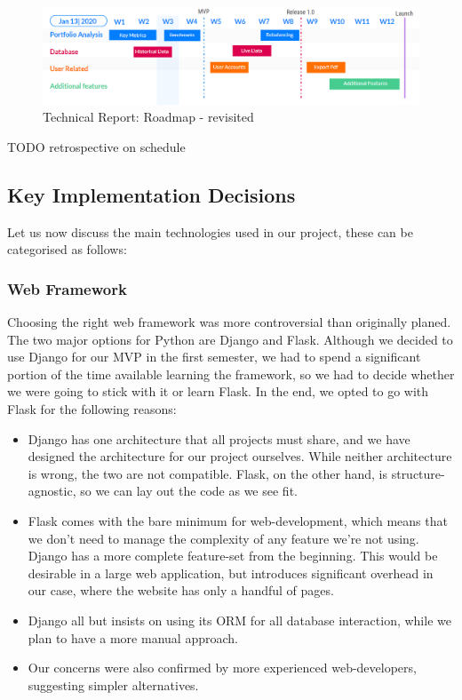 \documentclass[main.tex]{subfiles}
\begin{document}
\begin{figure}[H]
   \centering
   \includegraphics[scale=0.55]{05Coding/05Pictures/initial_roadmap.png}
   \caption{Technical Report: Roadmap - revisited}
   \label{Roadmap}
\end{figure}

TODO retrospective on schedule

\subsection{Key Implementation Decisions}

Let us now discuss the main technologies used in our project, these can be categorised as follows:
\subsubsection{Web Framework}
\label{Web Framework}
Choosing the right web framework was more controversial than originally planed. The two major options for Python are Django and Flask. Although we decided to use Django for our MVP in the first semester, we had to spend a significant portion of the time available learning the framework, so we had to decide whether we were going to stick with it or learn Flask. In the end, we opted to go with Flask for the following reasons:

\begin{itemize}
    \item Django has one architecture that all projects must share, and we have designed the architecture for our project ourselves. While neither architecture is wrong, the two are not compatible. Flask, on the other hand, is structure-agnostic, so we can lay out the code as we see fit.

    \item Flask comes with the bare minimum for web-development, which means that we don't need to manage the complexity of any feature we're not using. Django has a more complete feature-set from the beginning. This would be desirable in a large web application, but introduces significant overhead in our case, where the website has only a handful of pages.
    
    \item Django all but insists on using its ORM for all database interaction, while we plan to have a more manual approach.
    
    \item Our concerns were also confirmed by more experienced web-developers, suggesting simpler alternatives.
\end{itemize}
\end{document}
